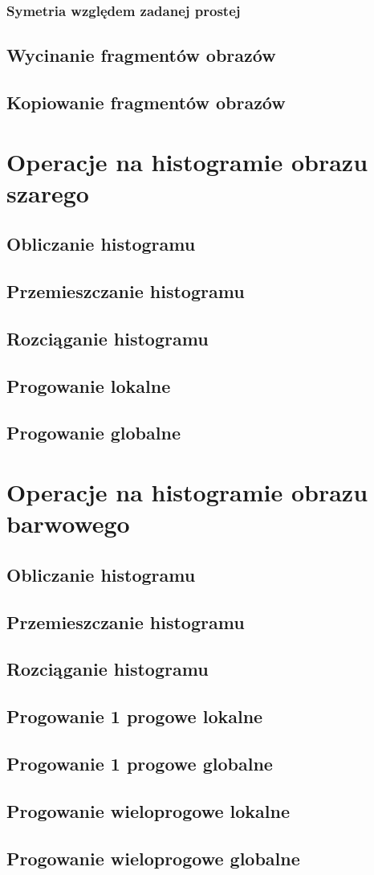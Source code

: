 \documentclass[a4paper,12pt, titlepage]{report}
\begin{document}
\subsection{Symetria względem zadanej prostej}
\section{Wycinanie fragmentów obrazów}
\section{Kopiowanie fragmentów obrazów}

\chapter{Operacje na histogramie obrazu szarego}
\section{Obliczanie histogramu}
\section{Przemieszczanie histogramu}
\section{Rozciąganie histogramu}
\section{Progowanie lokalne}
\section{Progowanie globalne}

\chapter{Operacje na histogramie obrazu barwowego}
\section{Obliczanie histogramu}
\section{Przemieszczanie histogramu}
\section{Rozciąganie histogramu}
\section{Progowanie 1 progowe lokalne}
\section{Progowanie 1 progowe globalne}
\section{Progowanie wieloprogowe lokalne}
\section{Progowanie wieloprogowe globalne}
\end{document}
